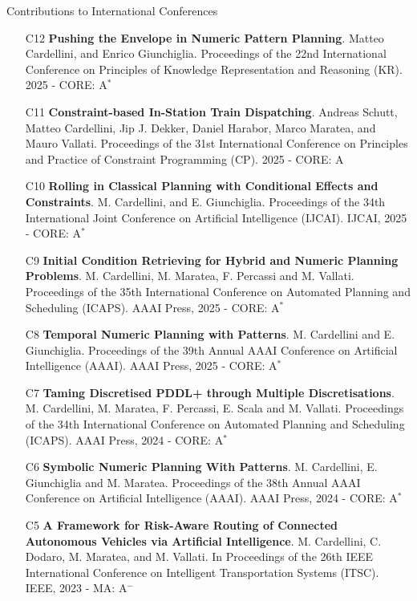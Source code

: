 \documentclass{resume} %
\begin{document}
\begin{rSection}{Contributions to International Conferences}
\begin{enumerate}[leftmargin=5mm]
	\item[C12] \textbf{Pushing the Envelope in Numeric Pattern Planning}. Matteo Cardellini, and Enrico Giunchiglia. Proceedings of the 22nd International Conference on Principles of Knowledge Representation and Reasoning (KR). 2025 - CORE: A$^{*}$
	
	
	\item[C11] \textbf{Constraint-based In-Station Train Dispatching}. Andreas Schutt, Matteo Cardellini, Jip J. Dekker, Daniel Harabor, Marco Maratea, and Mauro Vallati. Proceedings of the 31st International Conference on Principles and Practice of Constraint Programming (CP). 2025 - CORE: A
	
	
	\item[C10] \textbf{Rolling in Classical Planning with Conditional Effects and Constraints}. M. Cardellini, and E. Giunchiglia. Proceedings of the 34th International Joint Conference on Artificial Intelligence (IJCAI). IJCAI, 2025 - CORE: A$^{*}$
	
	\item[C9] \textbf{Initial Condition Retrieving for Hybrid and Numeric Planning Problems}. M. Cardellini, M. Maratea, F. Percassi and M. Vallati. Proceedings of the 35th International Conference on Automated Planning and Scheduling (ICAPS). AAAI Press, 2025 - CORE: A$^{*}$
	
	
	\item[C8] \textbf{Temporal Numeric Planning with Patterns}. M. Cardellini and E. Giunchiglia. Proceedings of the 39th Annual AAAI Conference on Artificial Intelligence (AAAI). AAAI Press, 2025 - CORE: A$^{*}$
	
	\item[C7] \textbf{Taming Discretised PDDL+ through Multiple Discretisations}. M. Cardellini, M. Maratea, F. Percassi, E. Scala and M. Vallati. Proceedings of the 34th International Conference on Automated Planning and Scheduling (ICAPS). AAAI Press, 2024 - CORE: A$^{*}$
	
	\item[C6] \textbf{Symbolic Numeric Planning With Patterns}. M. Cardellini, E. Giunchiglia and M. Maratea. Proceedings of the 38th Annual AAAI Conference on Artificial Intelligence (AAAI). AAAI Press, 2024 - CORE: A$^{*}$
	
	\item[C5] \textbf{A Framework for Risk-Aware Routing of Connected Autonomous Vehicles via Artificial Intelligence}. M. Cardellini, C. Dodaro, M. Maratea, and M. Vallati. In Proceedings of the 26th IEEE International Conference on Intelligent Transportation Systems (ITSC). IEEE, 2023 - MA: A$^-$
	

\end{enumerate}
\end{rSection}
\end{document}
